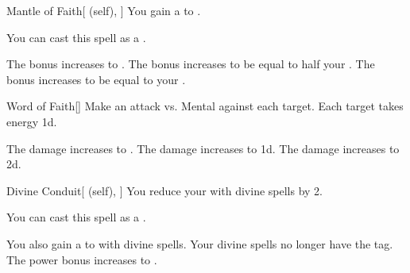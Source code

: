 \lowercase{\hypertarget{spell:Mantle of Faith}{}}\label{spell:Mantle of Faith}
\begin{attuneability}[Rank 1]{\hypertarget{spell:Mantle of Faith}{Mantle of Faith}}[ (self), ]
You gain a   to .

You can cast this spell as a .

\rankline
{} The bonus increases to .
 The bonus increases to be equal to half your .
 The bonus increases to be equal to your .
\end{attuneability}
\vspace{0.25em}



\lowercase{\hypertarget{spell:Word of Faith}{}}\label{spell:Word of Faith}
\begin{freeability}[Rank 1]{\hypertarget{spell:Word of Faith}{Word of Faith}}[]
Make an attack vs. Mental against each target.
\hit Each target takes energy  \minus1d.

\rankline
{} The damage increases to .
 The damage increases to  \plus1d.
 The damage increases to  \plus2d.
\end{freeability}
\vspace{0.25em}



\lowercase{\hypertarget{spell:Divine Conduit}{}}\label{spell:Divine Conduit}
\begin{attuneability}[Rank 2]{\hypertarget{spell:Divine Conduit}{Divine Conduit}}[ (self), ]
You reduce your  with divine spells by 2.

You can cast this spell as a .

\rankline
{} You also gain a   to  with divine spells.
 Your divine spells no longer have the  tag.
 The power bonus increases to .
\end{attuneability}
\vspace{0.25em}



